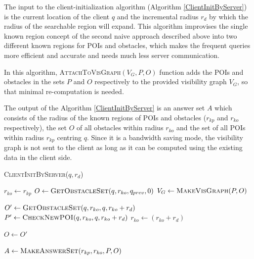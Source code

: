 \documentclass{sig-alternate}
\begin{document}
The input to the client-initialization algorithm (Algorithm \ref{ClientInitByServer}) is the current location of the client $q$ and the incremental radius $r_d$ by which the radius of the searchable region will expand. This algorithm improvises the single known region concept of the second naive approach described above into two different known regions for POIs and obstacles, which makes the frequent queries more efficient and accurate and needs much less server communication. 

In this algorithm, \textsc{AttachToVisGraph}$(V_G, P, O)$ function adds the POIs and obstacles in the sets $P$ and $O$ respectively to the provided visibility graph $V_G$, so that minimal re-computation is needed.

The output of the Algorithm \ref{ClientInitByServer} is an answer set $A$ which consists of the radius of the known regions of POIs and obstacles ($r_{kp}$ and $r_{ko}$ respectively), the set $O$ of all obstacles within radius $r_{ko}$ and the set of all POIs within radius $r_{kp}$ centring $q$. Since it is a bandwidth saving mode, the visibility graph is not sent to the client as long as it can be computed using the existing data in the client side.\\

\begin{algorithm}
\caption{\textsc{ClientInitByServer}($q, r_d$)}
\label{ClientInitByServer}

    
	 $r_{ko} \gets r_{kp} $ \; %
	 $O \gets \textsc{GetObstacleSet}(q, r_{ko}, q_{prev}, 0)$ \;
	 $V_G \gets \textsc{MakeVisGraph}(P, O)$ \;
	  { 
		$O' \gets \textsc{GetObstacleSet}(q, r_{ko}, q, r_{ko}+r_d)$ \;
		$P' \gets \textsc{CheckNewPOI}(q, r_{ko}, q, r_{ko}+r_d)$ \;
		$r_{ko} \gets (r_{ko} + r_d)$ \;
		
		$O \gets O'$
	} \label{while}
	
	 \Return $A \gets \textsc{MakeAnswerSet}(r_{kp}, r_{ko}, P, O)$ 
\end{algorithm}
\end{document}
